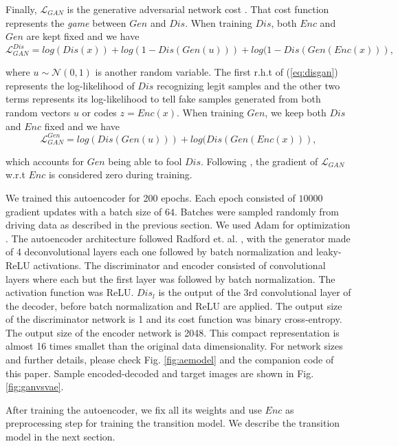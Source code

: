 \documentclass{article} %
\begin{document}
Finally, $\mathcal{L}_{GAN}$ is the generative adversarial network cost \cite{gan}. That cost function represents the \textit{game} between $Gen$ and $Dis$.
When training $Dis$, both $Enc$ and $Gen$ are kept fixed and we have
\begin{equation}
 \label{eq:disgan}
 \mathcal{L}_{GAN}^{Dis} = log(Dis(x)) + log(1 - Dis(Gen(u))) + log(1 - Dis(Gen(Enc(x))),
\end{equation}

where $u \sim \mathcal{N}(0, 1)$ is another random variable. The first r.h.t of (\ref{eq:disgan}) represents the log-likelihood of $Dis$ recognizing legit samples
and the other two terms represents its log-likelihood to tell fake samples generated from both random vectors $u$ or codes $z=Enc(x)$.
When training $Gen$, we keep both $Dis$ and $Enc$ fixed and we have
\begin{equation}
 \label{eq:gengan}
 \mathcal{L}_{GAN}^{Gen} = log(Dis(Gen(u))) + log(Dis(Gen(Enc(x))),
\end{equation}

which accounts for $Gen$ being able to fool $Dis$. Following \cite{aegan}, the gradient of $\mathcal{L}_{GAN}$ w.r.t $Enc$ is considered zero during training.

We trained this autoencoder for 200 epochs. Each epoch consisted of $10000$ gradient updates with a batch size of $64$.
Batches were sampled randomly from
driving data as described in the previous section. We used Adam for optimization \cite{adam}. The autoencoder architecture followed Radford et. al. \cite{dcgan},
with the generator made of 4 deconvolutional layers each one followed by batch normalization and leaky-ReLU activations. The discriminator and encoder
consisted of convolutional layers where each but the first layer was followed by batch normalization. The activation function was ReLU. $Dis_l$ is the output
of the 3rd convolutional layer of the decoder, before batch normalization and ReLU are applied. The output size of the
discriminator network is 1 and its cost function was binary cross-entropy. The output size of the encoder network is 2048. This compact representation is almost 16 times
smallet than the original data dimensionality. For network sizes and further details,
please check Fig. \ref{fig:aemodel} and the companion code of this paper. Sample encoded-decoded and target images are shown in Fig. \ref{fig:ganvsvae}.

After training the autoencoder, we fix all its weights and use $Enc$ as preprocessing step for training the transition model. We describe the transition model
in the next section.
\end{document}
